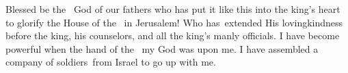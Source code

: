 \begin{inparaenum}\setcounter{enumi}{26}
   Blessed be the \lord\ God of our fathers who has put it like this into the king's heart to glorify the House of the \lord\ in Jerusalem!%
   Who has\understood{}\ extended His lovingkindness before the king, his counselors, and all the king's manly officials. I have become powerful when the hand of the \lord\ my God was upon me. I have assembled a company of soldiers\understood{}\ from Israel to go up with me.%
\end{inparaenum}
